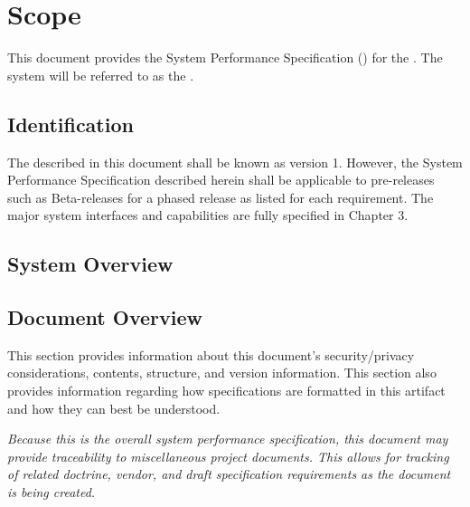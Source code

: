 
\chapter{Scope}
\label{loc:Scope}
% 

This document provides the System Performance Specification (\SPS) for the \ThisSystem. 
The system will be referred to as the \ThisSys.


\section{Identification}
\label{loc:Identification}
% 

The \ThisSystem described in this document shall be known as \ThisSys version 1.
However, the System Performance Specification {\SPS} described herein shall be applicable to pre-releases such as Beta-releases for a phased release as listed for each requirement.
The major system interfaces and capabilities are fully specified in Chapter 3.


\section{System Overview}
\label{loc:SystemOverview}
% 




\newpage
\section{Document Overview}
\label{loc:DocumentOverview}
% 

This section provides information about this document's security/privacy considerations, contents, structure, and version information.
This section also provides information regarding how specifications are formatted in this artifact and how they can best be understood.

% 

% 

% 

% 

% 

% 

{\em 
Because this is the overall system performance specification, this document may provide traceability to miscellaneous project documents.
This allows for tracking of related doctrine, vendor, and draft specification requirements as the document is being created.
}



